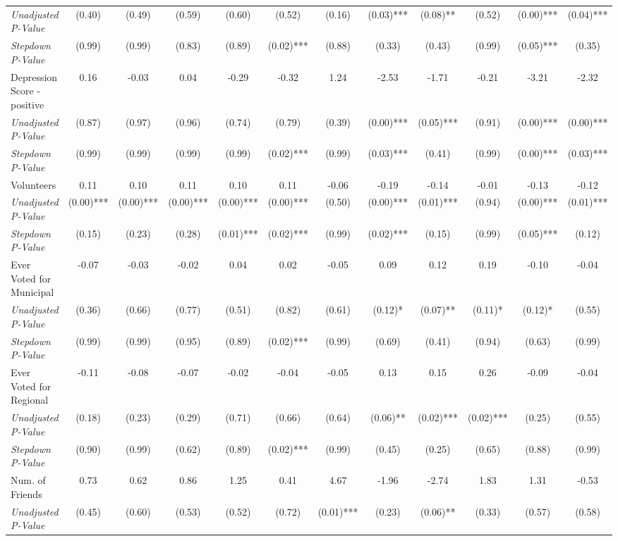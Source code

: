 \begin{tabular}{l c c c c c c c c c c c}
\quad \textit{Unadjusted P-Value} & (0.40) & (0.49) & (0.59) & (0.60) & (0.52) & (0.16) & (0.03)*** & (0.08)** & (0.52) & (0.00)*** & (0.04)*** \\
\quad \textit{Stepdown P-Value} & (0.99) & (0.99) & (0.83) & (0.89) & (0.02)*** & (0.88) & (0.33) & (0.43) & (0.99) & (0.05)*** & (0.35) \\
Depression Score - positive & 0.16 & -0.03 & 0.04 & -0.29 & -0.32 & 1.24 & -2.53 & -1.71 & -0.21 & -3.21 & -2.32 \\
\quad \textit{Unadjusted P-Value} & (0.87) & (0.97) & (0.96) & (0.74) & (0.79) & (0.39) & (0.00)*** & (0.05)*** & (0.91) & (0.00)*** & (0.00)*** \\
\quad \textit{Stepdown P-Value} & (0.99) & (0.99) & (0.99) & (0.99) & (0.02)*** & (0.99) & (0.03)*** & (0.41) & (0.99) & (0.00)*** & (0.03)*** \\
Volunteers & 0.11 & 0.10 & 0.11 & 0.10 & 0.11 & -0.06 & -0.19 & -0.14 & -0.01 & -0.13 & -0.12 \\
\quad \textit{Unadjusted P-Value} & (0.00)*** & (0.00)*** & (0.00)*** & (0.00)*** & (0.00)*** & (0.50) & (0.00)*** & (0.01)*** & (0.94) & (0.00)*** & (0.01)*** \\
\quad \textit{Stepdown P-Value} & (0.15) & (0.23) & (0.28) & (0.01)*** & (0.02)*** & (0.99) & (0.02)*** & (0.15) & (0.99) & (0.05)*** & (0.12) \\
Ever Voted for Municipal & -0.07 & -0.03 & -0.02 & 0.04 & 0.02 & -0.05 & 0.09 & 0.12 & 0.19 & -0.10 & -0.04 \\
\quad \textit{Unadjusted P-Value} & (0.36) & (0.66) & (0.77) & (0.51) & (0.82) & (0.61) & (0.12)* & (0.07)** & (0.11)* & (0.12)* & (0.55) \\
\quad \textit{Stepdown P-Value} & (0.99) & (0.99) & (0.95) & (0.89) & (0.02)*** & (0.99) & (0.69) & (0.41) & (0.94) & (0.63) & (0.99) \\
Ever Voted for Regional & -0.11 & -0.08 & -0.07 & -0.02 & -0.04 & -0.05 & 0.13 & 0.15 & 0.26 & -0.09 & -0.04 \\
\quad \textit{Unadjusted P-Value} & (0.18) & (0.23) & (0.29) & (0.71) & (0.66) & (0.64) & (0.06)** & (0.02)*** & (0.02)*** & (0.25) & (0.55) \\
\quad \textit{Stepdown P-Value} & (0.90) & (0.99) & (0.62) & (0.89) & (0.02)*** & (0.99) & (0.45) & (0.25) & (0.65) & (0.88) & (0.99) \\
Num. of Friends & 0.73 & 0.62 & 0.86 & 1.25 & 0.41 & 4.67 & -1.96 & -2.74 & 1.83 & 1.31 & -0.53 \\
\quad \textit{Unadjusted P-Value} & (0.45) & (0.60) & (0.53) & (0.52) & (0.72) & (0.01)*** & (0.23) & (0.06)** & (0.33) & (0.57) & (0.58) \\

\end{tabular}
